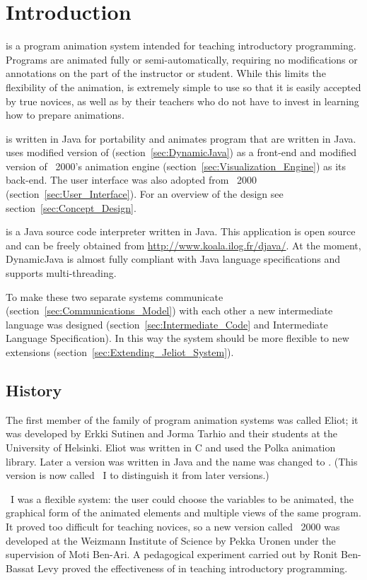 \section{Introduction}
\label{sec:Introduction}

\jel{} is a program animation system intended for teaching introductory
programming. Programs are animated fully or semi-automatically, requiring
no modifications or annotations on the part of the instructor or student.
While this limits the flexibility of the animation, \jel{} is extremely
simple to use so that it is easily accepted by true novices, as well as
by their teachers who do not have to invest in learning how to prepare
animations.

\jel{} is written in Java for portability and animates program that are
written in Java. \jel{} uses modified version of \djava{}
(section~\ref{sec:DynamicJava}) as a front-end and
modified version of \jel{}~2000's animation engine
(section~\ref{sec:Visualization_Engine}) as its back-end. The user interface
was also adopted from \jel{}~2000 (section~\ref{sec:User_Interface}).
For an overview of the design see section~\ref{sec:Concept_Design}.

\djava{} is a Java source code interpreter written in Java. This
application is open source and can be freely obtained from
\url{http://www.koala.ilog.fr/djava/}. At the moment, DynamicJava is
almost fully compliant with Java language specifications and supports
multi-threading.

To make these two separate systems communicate (section~\ref{sec:Communications_Model})
with each other a new intermediate language was designed (section~\ref {sec:Intermediate_Code}
and Intermediate Language Specification). In this way the system should be
more flexible to new extensions (section~\ref{sec:Extending_Jeliot_System}).

\subsection{History}

The first member of the \jel{} family of program animation systems was
called Eliot; it was developed by Erkki Sutinen and Jorma Tarhio and
their students at the University of Helsinki. Eliot was written in C
and used the Polka animation library. Later a version was written in
Java and the name was changed to \jel{}. (This version is now called
\jel{}~I to distinguish it from later versions.)

\jel{}~I was a flexible system: the user could choose the variables to
be animated, the graphical form of the animated elements and multiple
views of the same program. It proved too difficult for teaching novices,
so a new version called \jel{}~2000 was developed at the Weizmann Institute
of Science by Pekka Uronen under the supervision of Moti Ben-Ari.
A pedagogical experiment carried out by Ronit Ben-Bassat Levy proved
the effectiveness of \jel{} in teaching introductory programming.

